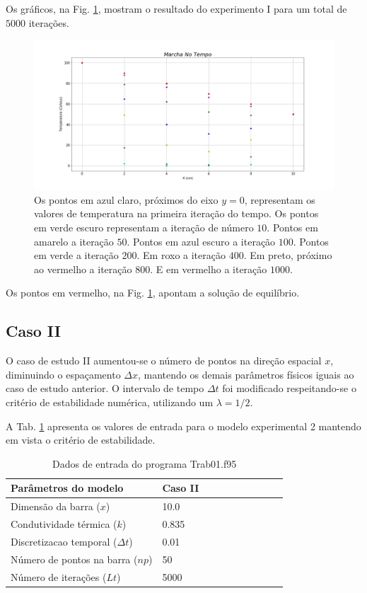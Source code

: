 \documentclass[12pt,a4paper,final]{report}%
\begin{document}
Os gráficos, na Fig. \ref{ResultadoI}, mostram o resultado do experimento I para um total de $5000$ iterações.

\begin{figure}[H]
\centering
\includegraphics[scale=0.35]{Imagens/Trab01.jpg}
\caption{Os pontos em azul claro, próximos do eixo $y=0$, representam os valores de temperatura na primeira iteração do tempo. Os pontos em verde escuro representam a iteração de número $10$. Pontos em amarelo a iteração $50$. Pontos em azul escuro a iteração $100$. Pontos em verde a iteração $200$. Em roxo a iteração $400$. Em preto, próximo ao vermelho a iteração $800$. E em vermelho a iteração $1000$. }
\label{ResultadoI}
\end{figure}

Os pontos em vermelho, na Fig. \ref{ResultadoI}, apontam a solução de equilíbrio. 

\subsection*{Caso II}

O caso de estudo II aumentou-se o número de pontos na direção espacial $x$, diminuindo o espaçamento $\Delta x$, mantendo os demais parâmetros físicos iguais ao caso de estudo anterior. O intervalo de tempo $\Delta t$ foi modificado respeitando-se o critério de estabilidade numérica, utilizando um $\lambda = 1/2$.

A Tab. \ref{casoII} apresenta os valores de entrada para o modelo experimental 2 mantendo em vista o critério de estabilidade.


\begin{table}[H]
\centering
\caption{Dados de entrada do programa Trab01.f95}
\label{casoII}
\begin{tabular}{@{}llllllllll@{}}
\toprule
Parâmetros do modelo                &   Caso II     		\\ \midrule
Dimensão da barra ($x$) 		    &    10.0     			\\
Condutividade térmica ($k$) 	    &    0.835           	\\
Discretizacao temporal ($\Delta t$) &    0.01    			\\
Número de pontos na barra ($np$)    &     50        		\\
Número de iterações ($Lt$)		    &    5000   			\\
\bottomrule
\end{tabular}
\end{table}
\end{document}
